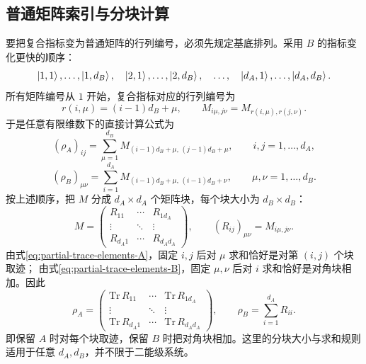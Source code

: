 \subsection{普通矩阵索引与分块计算}
要把复合指标变为普通矩阵的行列编号，必须先规定基底排列。采用 $B$ 的指标变化更快的顺序：
\begin{equation}
\Ket{1,1},\ldots,\Ket{1,d_B},\quad
\Ket{2,1},\ldots,\Ket{2,d_B},\quad\ldots,\quad
\Ket{d_A,1},\ldots,\Ket{d_A,d_B}.
\end{equation}
所有矩阵编号从 $1$ 开始，复合指标对应的行列编号为
\begin{equation}
 r\left(i,\mu\right)=\left(i-1\right)d_B+\mu,
\qquad M_{i\mu,j\nu}=M_{r\left(i,\mu\right),r\left(j,\nu\right)}.
\end{equation}
于是任意有限维数下的直接计算公式为
\begin{equation}
\boxed{\left(\rho_A\right)_{ij}
=\sum_{\mu=1}^{d_B}M_{\left(i-1\right)d_B+\mu,\,\left(j-1\right)d_B+\mu},}
\qquad i,j=1,\ldots,d_A,
\end{equation}
\begin{equation}
\boxed{\left(\rho_B\right)_{\mu\nu}
=\sum_{i=1}^{d_A}M_{\left(i-1\right)d_B+\mu,\,\left(i-1\right)d_B+\nu},}
\qquad \mu,\nu=1,\ldots,d_B.
\end{equation}
按上述顺序，把 $M$ 分成 $d_A\times d_A$ 个矩阵块，每个块大小为 $d_B\times d_B$：
\begin{equation}
M=\left(\begin{matrix}
R_{11}&\cdots&R_{1d_A}\\
\vdots&\ddots&\vdots\\
R_{d_A1}&\cdots&R_{d_Ad_A}
\end{matrix}\right),\qquad
\left(R_{ij}\right)_{\mu\nu}=M_{i\mu,j\nu}.
\end{equation}
由式\eqref{eq:partial-trace-elements-A}，固定 $i,j$ 后对 $\mu$ 求和恰好是对第 $\left(i,j\right)$ 个块取迹；
由式\eqref{eq:partial-trace-elements-B}，固定 $\mu,\nu$ 后对 $i$ 求和恰好是对角块相加。因此
\begin{equation}
\boxed{\rho_A=\left(\begin{matrix}
\mathrm{Tr}\,R_{11}&\cdots&\mathrm{Tr}\,R_{1d_A}\\
\vdots&\ddots&\vdots\\
\mathrm{Tr}\,R_{d_A1}&\cdots&\mathrm{Tr}\,R_{d_Ad_A}
\end{matrix}\right),\qquad
\rho_B=\sum_{i=1}^{d_A}R_{ii}.}
\label{eq:partial-trace-blocks}
\end{equation}
即保留 $A$ 时对每个块取迹，保留 $B$ 时把对角块相加。这里的分块大小与求和规则适用于任意 $d_A,d_B$，并不限于二能级系统。

